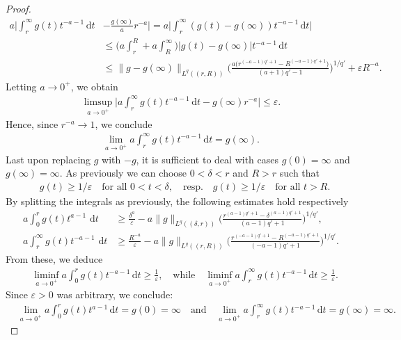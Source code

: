 \documentclass[12pt, reqno]{amsart}%
\theoremstyle{plain}  %
\theoremstyle{definition}  %
\theoremstyle{remark}
\numberwithin{equation}{section}
\renewcommand{\d}{\,\mathrm{d}}
\newcommand{\eps}{\varepsilon}
\begin{document}
\begin{proof}
\begin{align*}
a \Big|\int_r^\infty g(t)t^{-a-1}\d t &- \frac{g(\infty)}{a} r^{-a} \Big|
= a \Big|\int_r^\infty (g(t) - g(\infty))t^{-a-1}\d t \Big|\\
&\leq \Big(a \int_r^R+ a \int_R^\infty  \Big) |g(t) - g(\infty)|t^{-a-1}\d t\\
&\leq \|g -g(\infty)\|_{L^q( (r,R))}\Big(\frac{a\big( r^{(-a-1)q'+1}-R^{(-a-1)q'+1} \big)}{(a+1)q'-1}\Big)^{1/q'}
+ \varepsilon R^{-a}.
\end{align*}
Letting $a\to 0^+$, we obtain
\begin{align*}
\limsup_{a\to 0^+}  \Big| a\int_r^\infty g(t)t^{-a-1}\d t - g(\infty) r^{-a} \Big| \leq \varepsilon.
\end{align*}
Hence, since  $r^{-a} \to 1$, we conclude
\begin{align*}
\lim_{a\to0^+} a\int_r^\infty g(t)t^{-a-1}\d t = g(\infty).
\end{align*}
Last upon replacing $g$ with $-g$, it is sufficient to deal with cases $g(0)= \infty$ and $g(\infty)=\infty $. As previously we can choose $0<\delta<r$ and $R>r$ such that
\begin{align*}
&g(t)\geq 1/\eps \quad\text{for all $0<t<\delta$},\quad \text{resp.}\quad g(t)\geq 1/\eps \quad\text{for all $t>R$}.
\end{align*}
By splitting the integrals as previously, the following estimates hold respectively
\begin{align*}
a \int_0^r g(t) t^{a-1} \,\d t
&\geq \frac{\delta^a}{\varepsilon} - a \|g\|_{L^q((\delta,r))} \Big( \frac{r^{(a-1)q'+1} - \delta^{(a-1)q'+1}}{(a-1)q'+1} \Big)^{1/q'}, \\[1.5ex]
a \int_r^\infty g(t) t^{-a-1} \,\d t
&\geq \frac{R^{-a}}{\varepsilon} - a \|g\|_{L^q((r,R))} \Big( \frac{r^{(-a-1)q'+1} - R^{(-a-1)q'+1}}{(-a-1)q'+1} \Big)^{1/q'}.
\end{align*}
From these, we deduce
\begin{align*}
&\liminf_{a\to 0^+}  a\int_0^r g(t)t^{-a-1}\d t \geq \frac{1}{\varepsilon},\quad \text{while}\quad
\liminf_{a\to 0^+}  a\int_r^\infty g(t)t^{-a-1}\d t \geq \frac{1}{\varepsilon}.
\end{align*}
Since $\eps>0$ was arbitrary, we conclude:
\begin{align*}
&\lim_{a\to0^+} a\int_0^r g(t)t^{a-1}\d t = g(0)=\infty
\quad \text{and}\quad \lim_{a\to0^+} a\int_r^\infty g(t)t^{-a-1}\d t = g(\infty)=\infty.
\end{align*}
\end{proof}
\end{document}
